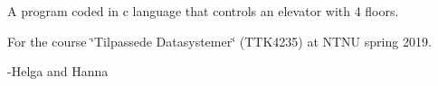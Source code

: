 A program coded in c language that controls an elevator with 4 floors.

For the course \char`\"{}\+Tilpassede Datasystemer\char`\"{} (T\+T\+K4235) at N\+T\+NU spring 2019.

-\/\+Helga and Hanna 
